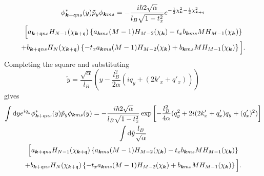 \begin{multline}
  \phi ^{*} _{\bm{k} + \mathfrak{q} ns} (y) \tilde{p}_{y} \phi _{\bm{k} m s}
  = -\frac{i\hbar 2 \sqrt{\alpha } }{l_{B} \sqrt{1 - t_{x}^2} }
  e^{-\frac{1}{2} \chi _{\bm{k}}^2 - \frac{1}{2} \chi _{\bm{k} + \mathfrak{q}} ^2}\\
  \Big[
  a_{\bm{k} + \mathfrak{q} ns} H_{N-1}(\chi_{\bm{k}+\mathfrak{q}})
  \left\{a_{\bm{k} ms} (M-1) H_{M-2} (\chi_{\bm{k}}) - t_{x} b_{\bm{k} ms} M H_{M-1} (\chi_{\bm{k}})\right\}\\
  +
  b_{\bm{k} + \mathfrak{q} ns} H_{N} (\chi_{\bm{k} + \mathfrak{q}})
  \left\{-t_{x} a_{\bm{k} ms} (M-1) H_{M-2} (\chi_{\bm{k}}) + b_{\bm{k} ms} M H_{M-1} (\chi_{\bm{k}})\right\}
  \Big].
\end{multline}
Completing the square and substituting
\[
  \tilde{y} = \frac{\sqrt{ \alpha  }}{l_{B}}
  \left(y - \frac{l_{B}^2}{2 \alpha } (i q_{y} + (2 k'_x + q' _x) ) \right)
\]
gives
\begin{multline}
  \int \mathrm{d}y
  e^{i q_{y}}
  \phi ^{*}_{\bm{k} + \mathfrak{q} ns}(y) \tilde{p}_{y}
  \phi_{\bm{k} ms} (y)
  =
  - \frac{i\hbar 2 \sqrt{\alpha} }{l_{B} \sqrt{1 - t_{x}^2} }
  \exp
  \left[
    - \frac{l_{B}^2}{4 \alpha } (q_{y}^2 + 2 i (2k' _x + q' _x) q_{y} + (q' _x)^2 )
  \right  ]\\
  \int \mathrm{d} \tilde{y} \frac{l_{B}}{\sqrt{\alpha } }\\
  \Big[
  a_{\bm{k} + \mathfrak{q} ns} H_{N-1}( \chi _{\bm{k} + \mathfrak{q}} )
  \left\{
    a_{\bm{k} ms} (M-1) H_{M-2} ( \chi _{\bm{k}} )
    - t_{x} b_{\bm{k} ms} M H_{M-1} ( \chi _{\bm{k}} ) \right\}\\
  +
  b_{\bm{k} + \mathfrak{q} ns} H_{N} ( \chi _{\bm{k} + \mathfrak{q}} )
  \left\{
    -t_{x} a_{\bm{k} ms} (M-1) H_{M-2} ( \chi _{\bm{k}} )
    + b_{\bm{k} ms} M H_{M-1} ( \chi _{\bm{k}} )
  \right\}
  \Big].
\end{multline}

